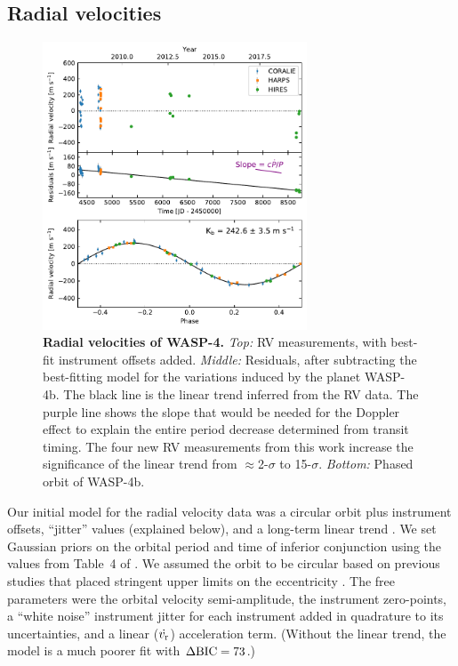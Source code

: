 \documentclass[12pt,twocolumn,tighten]{aastex62}
\begin{document}
\subsection{Radial velocities}

\begin{figure}[t]
	\begin{center}
		\leavevmode
		\includegraphics[width=0.7\textwidth]{f2.pdf}
	\end{center}
	\vspace{-0.7cm}
	\caption{
    {\bf Radial velocities of WASP-4.}
    {\it Top:} RV measurements, with best-fit instrument offsets
    added. 
    {\it Middle:}
    Residuals, after subtracting the best-fitting model for the
    variations induced by the planet WASP-4b. The black line is the
    linear trend inferred from the RV data.  The purple line shows the
    slope that would be needed for the Doppler effect to explain the
    entire period decrease determined from transit timing.  The four
    new RV measurements from this work increase the significance of
    the linear trend from $\approx$2-$\sigma$ to 15-$\sigma$.
    {\it Bottom:}
    Phased orbit of WASP-4b.
	\label{fig:rvs}
  \vspace{-0.0cm}
	}
\end{figure}

Our initial model for the radial velocity data was a circular orbit
plus instrument offsets, ``jitter'' values (explained below), and a
long-term linear trend \citep[][\texttt{radvel}]{fulton_radvel_2018}.
We set Gaussian priors on the orbital period and time of inferior
conjunction using the values from Table~4 of
.  We assumed the orbit to be circular
based on previous studies that placed stringent upper limits on the
eccentricity
\citep{beerer_secondary_2011,knutson_friends_2014,bonomo_gaps_2017}.
The free parameters were the orbital velocity semi-amplitude, the
instrument zero-points, a ``white noise'' instrument jitter for each
instrument added in quadrature to its uncertainties, and a linear
($\dot{v_{\rm r}}$) acceleration term.  (Without the linear trend, the
model is a much poorer fit with $\Delta {\rm BIC}=73$.)
\end{document}
